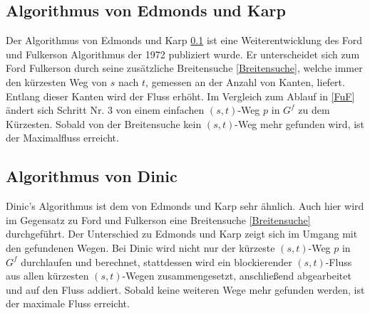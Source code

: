 \documentclass[a4paper]{llncs}
\begin{document}
\subsection{Algorithmus von Edmonds und Karp}
\label{EuK}
Der Algorithmus von Edmonds und Karp \ref{EuK} ist eine Weiterentwicklung des Ford und Fulkerson Algorithmus der 1972 publiziert wurde.
Er unterscheidet sich zum Ford Fulkerson durch seine zusätzliche Breitensuche \ref{Breitensuche},
welche immer den kürzesten Weg von $s$ nach $t$, gemessen an der Anzahl von Kanten, liefert. 
Entlang dieser Kanten wird der Fluss erhöht.
Im Vergleich zum Ablauf in \ref{FuF} ändert sich Schritt Nr. 3 von einem einfachen $(s, t)$-Weg $p$ in $G^{f}$ zu dem Kürzesten.
Sobald von der Breitensuche kein $(s,t)$-Weg mehr gefunden wird, ist der Maximalfluss erreicht.

\subsection{Algorithmus von Dinic}
\label{Dinic}
Dinic's Algorithmus ist dem von Edmonds und Karp sehr ähnlich. Auch hier wird im Gegensatz zu Ford und Fulkerson eine Breitensuche \ref{Breitensuche} durchgeführt. Der Unterschied zu Edmonds und Karp zeigt sich im Umgang mit den gefundenen Wegen. Bei Dinic wird nicht nur der kürzeste $(s, t)$-Weg $p$ in $G^{f}$ durchlaufen und berechnet, stattdessen wird ein blockierender $(s, t)$-Fluss aus allen kürzesten $(s, t)$-Wegen zusammengesetzt, anschließend abgearbeitet und auf den Fluss addiert. Sobald keine weiteren Wege mehr gefunden werden, ist der maximale Fluss erreicht.
\end{document}
